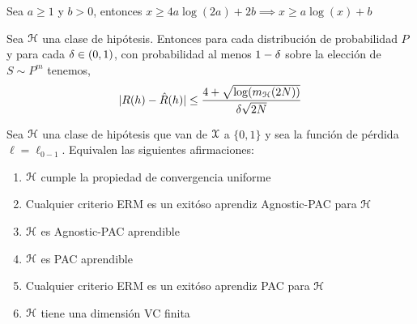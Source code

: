     \begin{lema}\label{lema:auxiliar3}
    Sea $a\geq 1$ y $b > 0$, entonces $x\geq 4a\log(2a) + 2b \implies x \geq a \log(x) + b$
    \end{lema}
    
    \begin{lema}\label{lema:auxiliar2}
    Sea $\mathcal{H}$ una clase de hipótesis. Entonces para cada distribución de probabilidad $P$ y para cada $\delta \in (0,1)$, con probabilidad al menos $1-\delta$ sobre la elección de $S \sim P^m$ tenemos,
    \begin{equation}
        |R(h) - \hat{R}(h)| \leq \frac{4 + \sqrt{\log(m_{\mathcal{H}}(2N))}}{\delta \sqrt{2N}}
    \end{equation}
    \end{lema}
    

    \begin{teorema}
    Sea $\mathcal{H}$ una clase de hipótesis que van de $\mathcal{X}$ a $\{0,1\}$ y sea la función de pérdida $\ell = \ell_{0-1}$. Equivalen las siguientes afirmaciones:
    \begin{enumerate}
        \item $\mathcal{H}$ cumple la propiedad de convergencia uniforme
        \item Cualquier criterio ERM es un exitóso aprendiz Agnostic-PAC para $\mathcal{H}$
        \item $\mathcal{H}$ es Agnostic-PAC aprendible
        \item $\mathcal{H}$ es PAC aprendible
        \item Cualquier criterio ERM es un exitóso aprendiz PAC para $\mathcal{H}$
        \item $\mathcal{H}$ tiene una dimensión VC finita
    \end{enumerate}
    \end{teorema}

